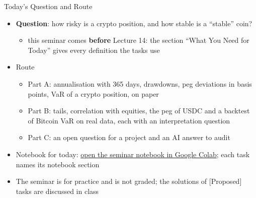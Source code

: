 \begin{frame}{Today's Question and Route}
\itemsize{\small}
\begin{itemize}
    \item \textbf{Question}: how risky is a crypto position, and how stable is a ``stable'' coin?
    \begin{itemize}
        \item this seminar comes \textbf{before} Lecture 14: the section ``What You Need for Today'' gives every definition the tasks use
    \end{itemize}
    \item Route
    \begin{itemize}
        \item Part A: annualisation with 365 days, drawdowns, peg deviations in basis points, VaR of a crypto position, on paper
        \item Part B: tails, correlation with equities, the peg of USDC and a backtest of Bitcoin VaR on real data, each with an interpretation question
        \item Part C: an open question for a project and an AI answer to audit
    \end{itemize}
    \item Notebook for today: \href{\nb}{open the seminar notebook in Google Colab}; each task names its notebook section
    \item The seminar is for practice and is not graded; the solutions of [Proposed] tasks are discussed in class
\end{itemize}
\end{frame}

